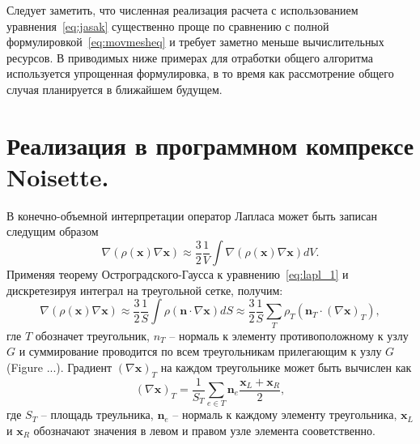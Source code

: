Следует заметить, что численная реализация расчета с использованием уравнения~\eqref{eq:jasak} существенно проще по сравнению с полной формулировкой~\eqref{eq:movmesheq} и требует заметно меньше вычислительных ресурсов. В приводимых ниже примерах для отработки общего алгоритма  используется упрощенная формулировка, в то время как рассмотрение общего случая планируется в ближайшем будущем.

\section{Реализация в программном компрексе Noisette.}

В конечно-объемной интерпретации оператор Лапласа может быть записан следущим образом
\begin{equation}
\nabla(\rho(\mathbf{x}) \nabla \mathbf{x})\approx \frac{3}{2}\frac{1}{V}\int \nabla(\rho(\mathbf{x}) \nabla \mathbf{x}) dV.
\label{eq:lapl_1}
\end{equation}
Применяя теорему Остроградского-Гаусса к уравнению~\eqref{eq:lapl_1} и дискретезируя интеграл на треугольной сетке, получим:
\begin{equation}
\nabla(\rho(\mathbf{x}) \nabla \mathbf{x})\approx \frac{3}{2}\frac{1}{S}\int \rho (\mathbf{n}\cdot \nabla \mathbf{x})dS
\approx \frac{3}{2}\frac{1}{S}\sum_{T} \rho_T (\mathbf{n}_T\cdot(\nabla \mathbf{x})_T) ,
\end{equation}
гле $T$ обозначет треугольник, $n_T$ -- нормаль к элементу противоположному к узлу $G$ и суммирование проводится по всем треугольникам прилегающим к узлу $G$ (Figure ...).
Градиент $(\nabla \mathbf{x})_T$ на каждом треугольнике может быть вычислен как 
\begin{equation}
(\nabla \mathbf{x})_T = \frac{1}{S_T}\sum_{e\in T}\mathbf{n}_e \frac{\mathbf{x}_L+\mathbf{x}_R}{2},
\label{eq:gradient}
\end{equation}
где $S_T$ -- площадь треульника, $\mathbf{n}_e$  -- нормаль к каждому элементу треугольника, $\mathbf{x}_L$ и $\mathbf{x}_R$ обозначают значения в левом и правом узле элемента сооветственно.

